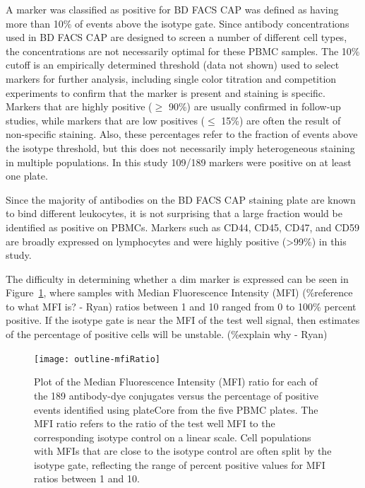 \documentclass[12pt]{article}
\begin{document}
A marker was classified as positive for BD FACS CAP was defined as having more than 10\% of
events above the isotype gate. Since antibody concentrations used in BD FACS CAP are designed
to screen a number of different cell types, the concentrations are not necessarily optimal for these PBMC samples. 
The 10\% cutoff is an empirically determined threshold (data not shown) used to select markers for further analysis,
including single color titration and competition experiments to confirm that the marker is present
and staining is specific. Markers that are highly positive ($\ge$ 90\%) are usually confirmed in
follow-up studies, while markers that are low positives ($\le$ 15\%) are often the result of non-specific
staining. Also, these percentages refer to the fraction of events above the isotype threshold, but
this does not necessarily imply heterogeneous staining in multiple populations.
In this study 109/189 markers were positive on at least one plate.

Since the majority of antibodies on the BD FACS CAP staining plate are known to bind different
leukocytes, it is not surprising that a large fraction would be identified as positive on PBMCs.  Markers such
as CD44, CD45, CD47, and CD59 are broadly expressed on lymphocytes and were highly positive (>99\%)
in this study. %

The difficulty in determining whether a dim marker
is expressed can be seen in Figure~\ref{fig:mfiRatio}, where samples with
Median Fluorescence Intensity (MFI) (\%reference to what MFI is? - Ryan) ratios
between 1 and 10 ranged from 0 to 100\% percent positive. If the isotype gate is near the MFI of the test well
signal, then estimates of the percentage of positive cells will be unstable.
(\%explain why - Ryan)



\clearpage
\begin{figure}
\centering
\texttt{[image: outline-mfiRatio]}
\caption{Plot of the Median Fluorescence Intensity (MFI) ratio for each of the 189 antibody-dye conjugates
versus the percentage of positive events identified using plateCore from the five PBMC plates.
The MFI ratio refers to the ratio of the test well MFI to the corresponding isotype control on a linear scale.
Cell populations with MFIs that are close to the isotype control are often split by the isotype
gate, reflecting the range of percent positive values for MFI ratios between 1 and 10.}
\label{fig:mfiRatio}
\end{figure}
\end{document}
